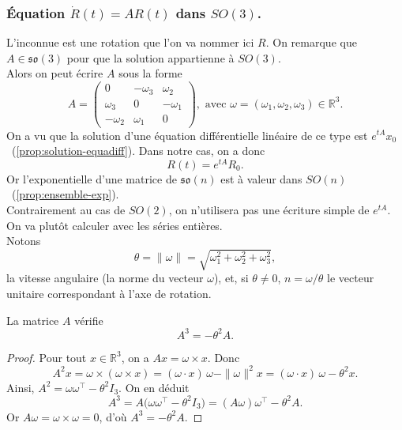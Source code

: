 \documentclass[12pt]{report}
\begin{document}
\subsubsection{Équation $\dot{R}(t)=A R(t)$ dans $SO(3)$.}
L'inconnue est une rotation que l'on va nommer ici $R$. On remarque que $A\in \mathfrak{so}(3)$ pour que la solution appartienne à $SO(3)$.\\
Alors on peut écrire $A$ sous la forme
\[
A=\begin{pmatrix}0 & -\omega_3 & \omega_2\\\omega_3 & 0 & -\omega_1\\-\omega_2 & \omega_1 & 0\end{pmatrix}, \text{ avec } \omega=(\omega_1,\omega_2,\omega_3)\in\mathbb{R}^3. 
\]
On a vu que la solution d'une équation différentielle linéaire de ce type est $e^{tA}x_0$~(\ref{prop:solution-equadiff}). Dans notre cas, on a donc
\[
R(t)=e^{tA}R_0.
\]
Or l'exponentielle d'une matrice de $\mathfrak{so}(n)$ est à valeur dans $SO(n)$~(\ref{prop:ensemble-exp}).\\
Contrairement au cas de $SO(2)$, on n'utilisera pas une écriture simple de $e^{tA}$. On va plutôt calculer avec les séries entières.\\
Notons
\[
\theta=\|\omega\|=\sqrt{\omega_1^2+\omega_2^2+\omega_3^2},
\]
la vitesse angulaire (la norme du vecteur $\omega$), et, si $\theta\neq0$, $n=\omega/\theta$ le vecteur unitaire correspondant à l'axe de rotation.
\begin{lemma}\label{lem:matrices-SO3}
La matrice $A$ vérifie
\[
A^3=-\theta^2 A.
\]
\end{lemma}

\begin{proof}
Pour tout $x\in\mathbb{R}^3$, on a $Ax=\omega\times x$. Donc
\[
A^2x=\omega\times(\omega\times x)=(\omega\cdot x)\,\omega-\|\omega\|^2x=(\omega\cdot x)\,\omega-\theta^2x.
\]
Ainsi, $A^2=\omega\omega^{\top}-\theta^2I_3$. On en déduit
\[
A^3=A\big(\omega\omega^{\top}-\theta^2I_3\big)=(A\omega)\omega^{\top}-\theta^2A.
\]
Or $A\omega=\omega\times\omega=0$, d'où $A^3=-\theta^2A$.
\end{proof}
\end{document}
